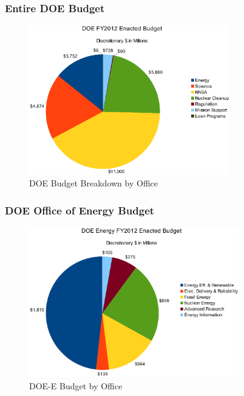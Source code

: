 \begin{frame}[ctb!]
  \frametitle{Entire DOE Budget}
  \begin{figure}[htbp!]
    \begin{center}
      \includegraphics[height=6.5cm]{doe.eps}
    \caption{DOE Budget Breakdown by Office\cite{chu_2012}}
    \label{fig:doe}
    \end{center}
  \end{figure}
\end{frame}

\begin{frame}[ctb!]
  \frametitle{DOE Office of Energy Budget}
  \begin{figure}[htbp!]
    \begin{center}
      \includegraphics[height=6.5cm]{doe-e.eps}
    \caption{DOE-E Budget by Office\cite{chu_2012}}
    \label{fig:doe-e}
    \end{center}
  \end{figure}
\end{frame}

